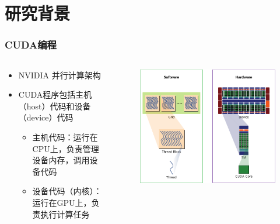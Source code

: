 \documentclass[aspectratio=169]{ctexbeamer}
\begin{document}
\section{研究背景}
\begin{frame}
  \frametitle{CUDA编程}
  \begin{columns}
    \begin{column}{0.4\textwidth}
      \begin{itemize}
        \item NVIDIA 并行计算架构
        \item CUDA程序包括主机（host）代码和设备（device）代码 \\
        \begin{itemize}
          \item 主机代码：运行在CPU上，负责管理设备内存，调用设备代码
          \item 设备代码（内核）：运行在GPU上，负责执行计算任务
        \end{itemize}
      \end{itemize}
    \end{column}
    \begin{column}{0.60\textwidth}
      \begin{figure}
        \includegraphics[width=\textwidth]{figures/programming_model_executing_model.pdf}
      \end{figure}
    \end{column}
  \end{columns}
\end{frame}
\end{document}
